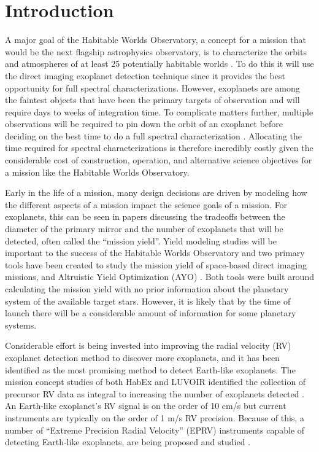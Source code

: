 \section{Introduction}

A major goal of the Habitable Worlds Observatory, a concept for a mission that
would be the next flagship astrophysics observatory, is to characterize the
orbits and atmospheres of at least 25 potentially habitable worlds
\citep{GreatObservatory}. To do this it will use the direct imaging exoplanet
detection technique since it provides the best opportunity for full spectral
characterizations. However, exoplanets are among the faintest objects that have
been the primary targets of observation and will require days to weeks of
integration time. To complicate matters further, multiple observations will be
required to pin down the orbit of an exoplanet before deciding on the best time
to do a full spectral characterization \citep{horningMinimumNumber2019}.
Allocating the time required for spectral characterizations is therefore
incredibly costly given the considerable cost of construction, operation, and
alternative science objectives for a mission like the Habitable Worlds
Observatory.

Early in the life of a mission, many design decisions are driven by modeling
how the different aspects of a mission impact the science goals of a mission.
For exoplanets, this can be seen in papers discussing the tradeoffs between the
diameter of the primary mirror and the number of exoplanets that will be
detected, often called the ``mission yield''. Yield modeling studies will be
important to the success of the Habitable Worlds Observatory and two primary
tools have been created to study the mission yield of space-based direct
imaging missions, 
\citep{savranskyEXOSIMSExoplanetOpenSource2017} and Altruistic Yield
Optimization (AYO) \citep{starkMaximizingExoEarthCandidate2014}. Both tools
were built around calculating the mission yield with no prior information about
the planetary system of the available target stars. However, it is likely that
by the time of launch there will be a considerable amount of information for
some planetary systems.

Considerable effort is being invested into improving the radial velocity (RV)
exoplanet detection method to discover more exoplanets, and it has been
identified as the most promising method to detect Earth-like exoplanets. The
mission concept studies of both HabEx and LUVOIR identified the collection of
precursor RV data as integral to increasing the number of exoplanets detected
\citep{gaudiHabitableExoplanetObservatory2020, TheLUVOIRTeam2019}. An
Earth-like exoplanet's RV signal is on the order of 10 cm/s but current
instruments are typically on the order of 1 m/s RV precision. Because of
this, a number of ``Extreme Precision Radial Velocity'' (EPRV) instruments capable of detecting Earth-like exoplanets, are being proposed and
studied \citep{Crass2021}.

